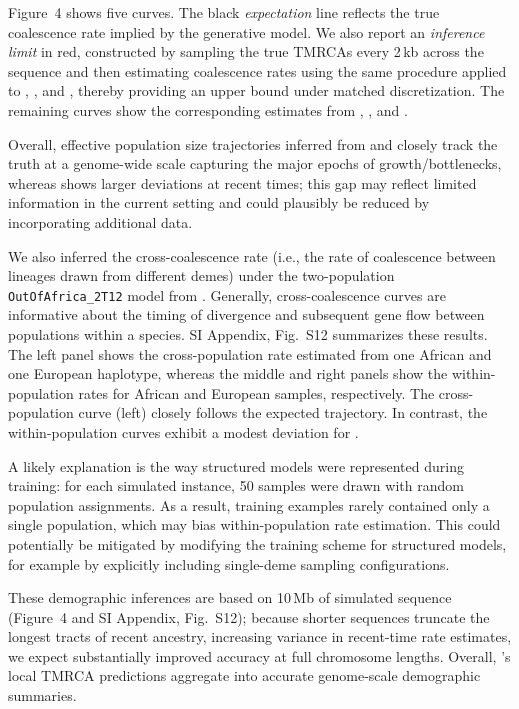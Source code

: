 \documentclass[9pt,twocolumn,twoside]{pnas-new}
\begin{document}
Figure~4 shows five curves.
The black \emph{expectation} line reflects the true coalescence rate implied by the generative model.
We also report an \emph{inference limit} in red, constructed by sampling the true TMRCAs every 2\,kb across the sequence
and then estimating coalescence rates using the same procedure applied to \cxtkit, \singer, and \smcpp,
thereby providing an upper bound under matched discretization.
The remaining curves show the corresponding estimates from \cxtkit, \singer, and \smcpp.

Overall, effective population size trajectories inferred from \cxtkit and \singer
closely track the truth at a genome-wide scale capturing the major epochs of growth/bottlenecks,
whereas \smcpp shows larger deviations at recent times;
this gap may reflect limited information in the current setting
and could plausibly be reduced by incorporating additional data.


We also inferred the cross-coalescence rate (i.e., the rate of coalescence between lineages drawn from different demes) 
under the two-population \texttt{OutOfAfrica\_2T12} model from \stdpopsim.
Generally, cross-coalescence curves are informative about the timing of divergence 
and subsequent gene flow between populations within a species.
SI Appendix, Fig.~S12 summarizes these results.
The left panel shows the cross-population rate estimated from one African and one European haplotype, 
whereas the middle  and right panels show the within-population rates for African and European samples, respectively.
The cross-population curve (left) closely follows the expected trajectory.
In contrast, the within-population curves exhibit a modest deviation for \cxtkit.

A likely explanation is the way structured models were represented during training:
for each simulated instance, 50 samples were drawn with random population assignments.
As a result, training examples rarely contained only a single population,
which may bias within-population rate estimation.
This could potentially be mitigated by modifying the training scheme for structured models,
for example by explicitly including single-deme sampling configurations.

These demographic inferences are based on 10\,Mb of simulated sequence (Figure~4 and SI Appendix, Fig.~S12);
because shorter sequences truncate the longest tracts of recent ancestry, increasing variance in recent-time rate estimates,
we expect substantially improved accuracy at full chromosome lengths.
Overall, \cxtkit's local TMRCA predictions aggregate into accurate genome-scale demographic summaries.
\end{document}
